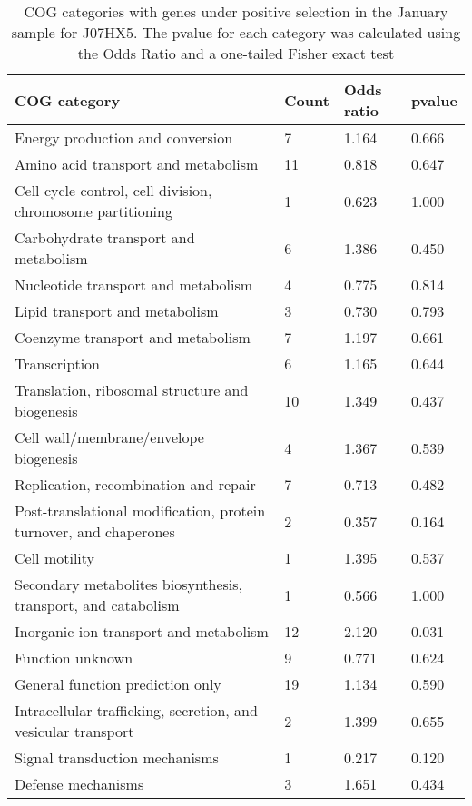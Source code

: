 \clearpage
\begin{table}[]
\footnotesize 
	\tabcolsep=0.11cm 
\caption{COG categories with genes under positive selection in the January sample for J07HX5. The pvalue for each category was calculated using the Odds Ratio and a one-tailed Fisher exact test} 
\begin{tabularx}{\textwidth}{L{6cm}R{2cm}R{2cm}R{2cm}} 
\hline 
\textbf{COG category} & \textbf{Count} & \textbf{Odds ratio} & \textbf{pvalue} \\ 
\hline 
Energy production and conversion & 7 & 1.164 & 0.666 \\ 
Amino acid transport and metabolism & 11 & 0.818 & 0.647 \\ 
Cell cycle control, cell division, chromosome partitioning & 1 & 0.623 & 1.000 \\ 
Carbohydrate transport and metabolism & 6 & 1.386 & 0.450 \\ 
Nucleotide transport and metabolism & 4 & 0.775 & 0.814 \\ 
Lipid transport and metabolism & 3 & 0.730 & 0.793 \\ 
Coenzyme transport and metabolism & 7 & 1.197 & 0.661 \\ 
Transcription & 6 & 1.165 & 0.644 \\ 
Translation, ribosomal structure and biogenesis & 10 & 1.349 & 0.437 \\ 
Cell wall/membrane/envelope biogenesis & 4 & 1.367 & 0.539 \\ 
Replication, recombination and repair & 7 & 0.713 & 0.482 \\ 
Post-translational modification, protein turnover, and chaperones & 2 & 0.357 & 0.164 \\ 
Cell motility & 1 & 1.395 & 0.537 \\ 
Secondary metabolites biosynthesis, transport, and catabolism & 1 & 0.566 & 1.000 \\ 
Inorganic ion transport and metabolism & 12 & 2.120 & 0.031 \\ 
Function unknown & 9 & 0.771 & 0.624 \\ 
General function prediction only & 19 & 1.134 & 0.590 \\ 
Intracellular trafficking, secretion, and vesicular transport & 2 & 1.399 & 0.655 \\ 
Signal transduction mechanisms & 1 & 0.217 & 0.120 \\ 
Defense mechanisms & 3 & 1.651 & 0.434 \\ 
\end{tabularx} 
\label{January_COG_Selection_J07HX5} 
 \end{table} 

